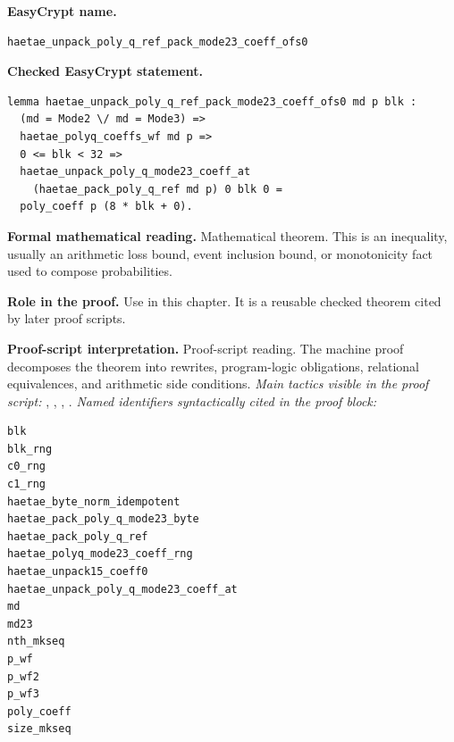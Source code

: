 \begin{formaltheorem}
\noindent\textbf{EasyCrypt name.}
\begin{lstlisting}[language=EasyCrypt,basicstyle=\ttfamily\scriptsize]
haetae_unpack_poly_q_ref_pack_mode23_coeff_ofs0
\end{lstlisting}
\noindent\textbf{Checked EasyCrypt statement.}
\begin{lstlisting}[language=EasyCrypt,basicstyle=\ttfamily\scriptsize]
lemma haetae_unpack_poly_q_ref_pack_mode23_coeff_ofs0 md p blk :
  (md = Mode2 \/ md = Mode3) =>
  haetae_polyq_coeffs_wf md p =>
  0 <= blk < 32 =>
  haetae_unpack_poly_q_mode23_coeff_at
    (haetae_pack_poly_q_ref md p) 0 blk 0 =
  poly_coeff p (8 * blk + 0).
\end{lstlisting}
\noindent\textbf{Formal mathematical reading.}
Mathematical theorem. This is an inequality, usually an arithmetic loss bound, event inclusion bound, or monotonicity fact used to compose probabilities.

\noindent\textbf{Role in the proof.}
Use in this chapter. It is a reusable checked theorem cited by later proof scripts.

\noindent\textbf{Proof-script interpretation.}
Proof-script reading. The machine proof decomposes the theorem into rewrites, program-logic obligations, relational equivalences, and arithmetic side conditions.
\emph{Main tactics visible in the proof script:} , , , .
\emph{Named identifiers syntactically cited in the proof block:}
\begin{lstlisting}[language=EasyCrypt,basicstyle=\ttfamily\scriptsize]
blk
blk_rng
c0_rng
c1_rng
haetae_byte_norm_idempotent
haetae_pack_poly_q_mode23_byte
haetae_pack_poly_q_ref
haetae_polyq_mode23_coeff_rng
haetae_unpack15_coeff0
haetae_unpack_poly_q_mode23_coeff_at
md
md23
nth_mkseq
p_wf
p_wf2
p_wf3
poly_coeff
size_mkseq
\end{lstlisting}

\end{formaltheorem}

